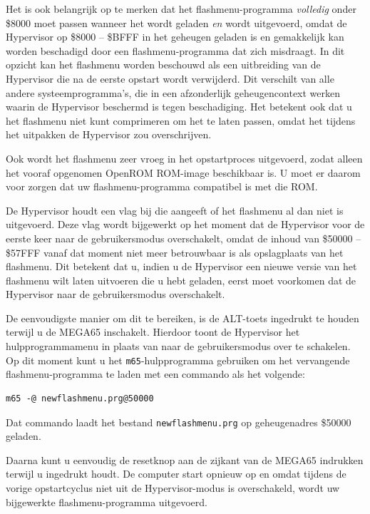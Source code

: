 Het is ook belangrijk op te merken dat het flashmenu-programma {\em volledig} onder \$8000 moet passen wanneer het wordt geladen {\em en} wordt uitgevoerd, omdat de Hypervisor op \$8000 -- \$BFFF in het geheugen geladen is en gemakkelijk kan worden beschadigd door een flashmenu-programma dat zich misdraagt. In dit opzicht kan het flashmenu worden beschouwd als een uitbreiding van de Hypervisor die na de eerste opstart wordt verwijderd. Dit verschilt van alle andere systeemprogramma's, die in een afzonderlijk geheugencontext werken waarin de Hypervisor beschermd is tegen beschadiging. Het betekent ook dat u het flashmenu niet kunt comprimeren om het te laten passen, omdat het tijdens het uitpakken de Hypervisor zou overschrijven.

Ook wordt het flashmenu zeer vroeg in het opstartproces uitgevoerd, zodat alleen het vooraf opgenomen OpenROM ROM-image beschikbaar is. U moet er daarom voor zorgen dat uw flashmenu-programma compatibel is met die ROM.

De Hypervisor houdt een vlag bij die aangeeft of het flashmenu al dan niet is uitgevoerd. Deze vlag wordt bijgewerkt op het moment dat de Hypervisor voor de eerste keer naar de gebruikersmodus overschakelt, omdat de inhoud van \$50000 -- \$57FFF vanaf dat moment niet meer betrouwbaar is als opslagplaats van het flashmenu. Dit betekent dat u, indien u de Hypervisor een nieuwe versie van het flashmenu wilt laten uitvoeren die u hebt geladen, eerst moet voorkomen dat de Hypervisor naar de gebruikersmodus overschakelt.

De eenvoudigste manier om dit te bereiken, is de ALT-toets ingedrukt te houden terwijl u de MEGA65 inschakelt. Hierdoor toont de Hypervisor het hulpprogrammamenu in plaats van naar de gebruikersmodus over te schakelen. Op dit moment kunt u het {\tt m65}-hulpprogramma gebruiken om het vervangende flashmenu-programma te laden met een commando als het volgende:

\begin{tcolorbox}[colback=black,coltext=white]
\verbatimfont{\codefont}
\begin{verbatim}
m65 -@ newflashmenu.prg@50000
\end{verbatim}
\end{tcolorbox}

Dat commando laadt het bestand {\tt newflashmenu.prg} op geheugenadres \$50000 geladen.

Daarna kunt u eenvoudig de resetknop aan de zijkant van de MEGA65 indrukken terwijl u  ingedrukt houdt. De computer start opnieuw op en omdat tijdens de vorige opstartcyclus niet uit de Hypervisor-modus is overschakeld, wordt uw bijgewerkte flashmenu-programma uitgevoerd.

